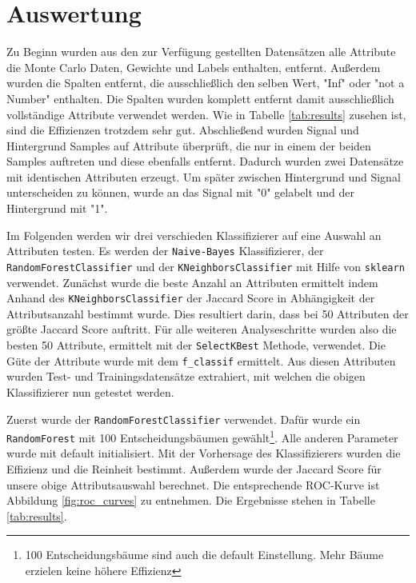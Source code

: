 \section{Auswertung}
\label{sec:auswertung}

Zu Beginn wurden aus den zur Verf\"ugung gestellten Datens\"atzen alle Attribute die Monte Carlo Daten, Gewichte und Labels enthalten, entfernt. Au\ss erdem wurden die Spalten entfernt, die ausschlie\ss lich den selben Wert, "Inf" oder "not a Number" enthalten.
Die Spalten wurden komplett entfernt damit ausschlie\ss lich vollst\"andige Attribute verwendet werden.
Wie in Tabelle \ref{tab:results} zusehen ist, sind die Effizienzen trotzdem sehr gut.
Abschlie\ss end wurden Signal und Hintergrund Samples auf Attribute \"uberpr\"uft, die nur in einem der beiden Samples auftreten und diese ebenfalls entfernt. Dadurch wurden zwei Datens\"atze mit identischen Attributen erzeugt.
Um sp\"ater zwischen Hintergrund und Signal unterscheiden zu k\"onnen, wurde an das Signal mit "0" gelabelt und der Hintergrund mit "1".

Im Folgenden werden wir drei verschieden Klassifizierer auf eine Auswahl an Attributen testen. Es werden der \texttt{Naive-Bayes} Klassifizierer, der \texttt{RandomForestClassifier} und der \texttt{KNeighborsClassifier} mit Hilfe von \texttt{sklearn} verwendet.
Zun\"achst wurde die beste Anzahl an Attributen ermittelt indem Anhand des \texttt{KNeighborsClassifier} der Jaccard Score in Abh\"angigkeit der Attributsanzahl bestimmt wurde. Dies resultiert darin, dass bei 50 Attributen der gr\"o\ss te Jaccard Score auftritt.
F\"ur alle weiteren Analyseschritte wurden also die besten 50 Attribute, ermittelt mit der \texttt{SelectKBest} Methode, verwendet.
Die G\"ute der Attribute wurde mit dem \texttt{f\_classif} ermittelt.
Aus diesen Attributen wurden Test- und Trainingsdatens\"atze extrahiert, mit welchen die obigen Klassifizierer nun getestet werden.

Zuerst wurde der \texttt{RandomForestClassifier} verwendet.
Dafür wurde ein \texttt{RandomForest} mit 100 Entscheidungsb\"aumen gew\"ahlt\footnote{100 Entscheidungsb\"aume sind auch die default Einstellung. Mehr B\"aume erzielen keine h\"ohere Effizienz}. Alle anderen Parameter wurde mit default initialisiert.
Mit der Vorhersage des Klassifizierers wurden die Effizienz und die Reinheit bestimmt.
Au\ss erdem wurde der Jaccard Score f\"ur unsere obige Attributsauswahl berechnet. Die entsprechende ROC-Kurve ist Abbildung \ref{fig:roc_curves} zu entnehmen.
Die Ergebnisse stehen in Tabelle \ref{tab:results}.

